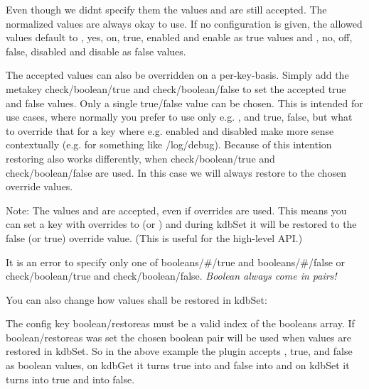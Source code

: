 Even though we didn\textquotesingle{}t specify them the values {} and {} are still accepted. The normalized values are always okay to use. If no configuration is given, the allowed values default to {}, {\ttfamily yes}, {\ttfamily on}, {\ttfamily true}, {\ttfamily enabled} and {\ttfamily enable} as true values and {}, {\ttfamily no}, {\ttfamily off}, {\ttfamily false}, {\ttfamily disabled} and {\ttfamily disable} as false values.

The accepted values can also be overridden on a per-\/key-\/basis. Simply add the metakey {\ttfamily check/boolean/true} and {\ttfamily check/boolean/false} to set the accepted true and false values. Only a single true/false value can be chosen. This is intended for use cases, where normally you prefer to use only e.\+g. {}, {} and {\ttfamily true}, {\ttfamily false}, but what to override that for a key where e.\+g. {\ttfamily enabled} and {\ttfamily disabled} make more sense contextually (e.\+g. for something like {\ttfamily /log/debug}). Because of this intention restoring also works differently, when {\ttfamily check/boolean/true} and {\ttfamily check/boolean/false} are used. In this case we will always restore to the chosen override values.

Note\+: The values {} and {} are accepted, even if overrides are used. This means you can set a key with overrides to {} (or {}) and during {\ttfamily kdb\+Set} it will be restored to the false (or true) override value. (This is useful for the high-\/level A\+PI.)

It is an error to specify only one of {\ttfamily booleans/\#/true} and {\ttfamily booleans/\#/false} or {\ttfamily check/boolean/true} and {\ttfamily check/boolean/false}. {\itshape Boolean always come in pairs!}

You can also change how values shall be restored in {\ttfamily kdb\+Set}\+:




The config key {\ttfamily boolean/restoreas} must be a valid index of the {\ttfamily booleans} array. If {\ttfamily boolean/restoreas} was set the chosen boolean pair will be used when values are restored in {\ttfamily kdb\+Set}. So in the above example the plugin accepts {}, {\ttfamily true}, {} and {\ttfamily false} as boolean values, on {\ttfamily kdb\+Get} it turns {\ttfamily true} into {} and {\ttfamily false} into {} and on {\ttfamily kdb\+Set} it turns {} into {\ttfamily true} and {} into {\ttfamily false}.

